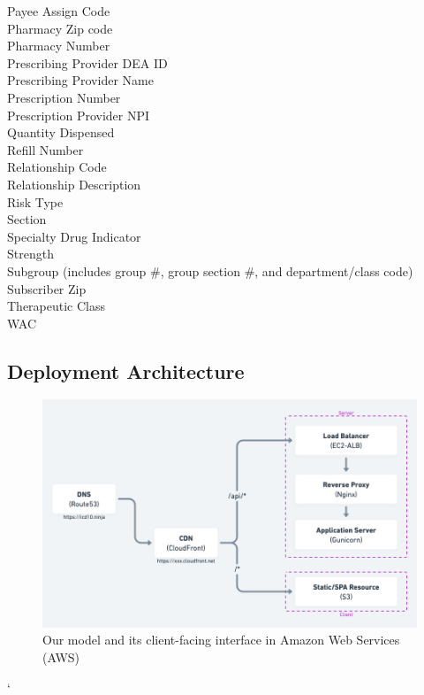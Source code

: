 \documentclass[twoside,11pt]{article}
\begin{document}
{\begin{multicols}{2}
  Payee Assign Code \\
  Pharmacy  Zip code \\
  Pharmacy Number \\
  Prescribing Provider DEA ID \\
  Prescribing Provider Name \\
  Prescription Number \\
  Prescription Provider NPI \\
  Quantity Dispensed \\
  Refill Number \\
  Relationship Code \\
  Relationship Description \\
  Risk Type \\
  Section \\
  Specialty Drug Indicator \\
  Strength \\
  Subgroup (includes group \#, group section \#, and department/class code) \\
  Subscriber Zip \\
  Therapeutic Class \\
  WAC \\
\end{multicols}


\newpage
\subsection{Deployment Architecture}

\begin{figure}[H]
  \includegraphics[width=\textwidth]{./images/stack.png}
  \caption{Our model and its client-facing interface in Amazon Web Services (AWS)}
  \label{fig:deployment}
\end{figure}
`

}
\end{document}
